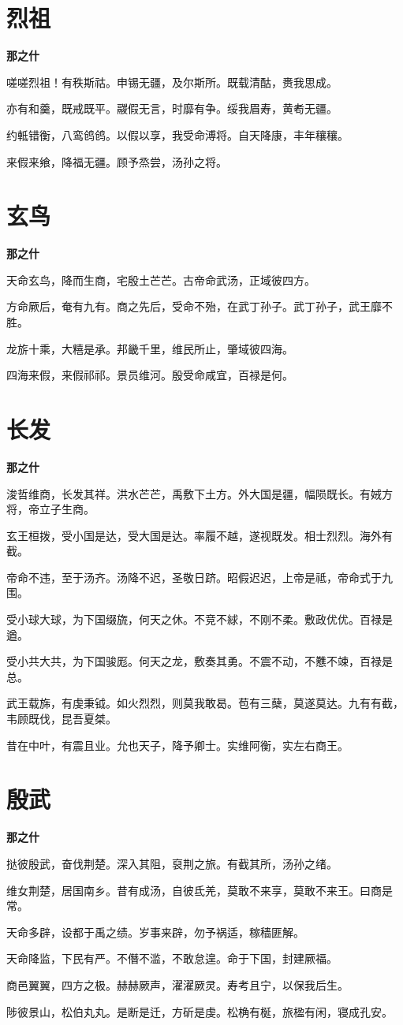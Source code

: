 \documentclass[12pt,a4paper]{ctexbook}
\begin{document}
\section{烈祖}
\textbf{那之什}\par\vspace{0.5em}
嗟嗟烈祖！有秩斯祜。申锡无疆，及尔斯所。既载清酤，赉我思成。\par
亦有和羹，既戒既平。鬷假无言，时靡有争。绥我眉寿，黄耇无疆。\par
约軧错衡，八鸾鸧鸧。以假以享，我受命溥将。自天降康，丰年穰穰。\par
来假来飨，降福无疆。顾予烝尝，汤孙之将。\par

\section{玄鸟}
\textbf{那之什}\par\vspace{0.5em}
天命玄鸟，降而生商，宅殷土芒芒。古帝命武汤，正域彼四方。\par
方命厥后，奄有九有。商之先后，受命不殆，在武丁孙子。武丁孙子，武王靡不胜。\par
龙旂十乘，大糦是承。邦畿千里，维民所止，肇域彼四海。\par
四海来假，来假祁祁。景员维河。殷受命咸宜，百禄是何。\par

\section{长发}
\textbf{那之什}\par\vspace{0.5em}
浚哲维商，长发其祥。洪水芒芒，禹敷下土方。外大国是疆，幅陨既长。有娀方将，帝立子生商。\par
玄王桓拨，受小国是达，受大国是达。率履不越，遂视既发。相士烈烈。海外有截。\par
帝命不违，至于汤齐。汤降不迟，圣敬日跻。昭假迟迟，上帝是祗，帝命式于九围。\par
受小球大球，为下国缀旒，何天之休。不竞不絿，不刚不柔。敷政优优。百禄是遒。\par
受小共大共，为下国骏厖。何天之龙，敷奏其勇。不震不动，不戁不竦，百禄是总。\par
武王载旆，有虔秉钺。如火烈烈，则莫我敢曷。苞有三蘖，莫遂莫达。九有有截，韦顾既伐，昆吾夏桀。\par
昔在中叶，有震且业。允也天子，降予卿士。实维阿衡，实左右商王。\par

\section{殷武}
\textbf{那之什}\par\vspace{0.5em}
挞彼殷武，奋伐荆楚。深入其阻，裒荆之旅。有截其所，汤孙之绪。\par
维女荆楚，居国南乡。昔有成汤，自彼氐羌，莫敢不来享，莫敢不来王。曰商是常。\par
天命多辟，设都于禹之绩。岁事来辟，勿予祸适，稼穑匪解。\par
天命降监，下民有严。不僭不滥，不敢怠遑。命于下国，封建厥福。\par
商邑翼翼，四方之极。赫赫厥声，濯濯厥灵。寿考且宁，以保我后生。\par
陟彼景山，松伯丸丸。是断是迁，方斫是虔。松桷有梴，旅楹有闲，寝成孔安。\par
\end{document}
